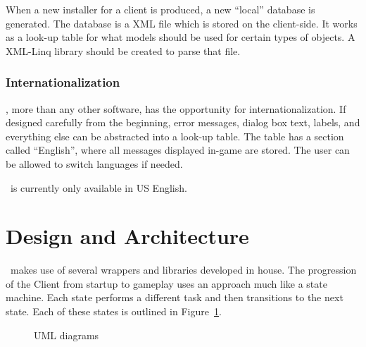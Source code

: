 When a new installer for a client is produced, a new ``local'' database is generated. The database is a XML file which is stored on the client-side. It works as a look-up table for what models should be used for certain types of objects. A XML-Linq library should be created to parse that file.

\subsubsection*{Internationalization}

\Client, more than any other software, has the opportunity for internationalization. If designed carefully from the beginning, error messages, dialog box text, labels, and everything else can be abstracted into a look-up table. The table has a section called ``English'', where all messages displayed in-game are stored. The user can be allowed to switch languages if needed.

\Client\ is currently only available in US English.

\section{Design and Architecture}

\Client\ makes use of several wrappers and libraries developed in house. The progression of the Client from startup to gameplay uses an approach much like a state machine. Each state performs a different task and then transitions to the next state. Each of these states is outlined in Figure~\ref{fig:clientUML}. 

\begin{figure}
	\centering
	\caption{\Client UML diagrams}
	\label{fig:clientUML}
\end{figure}

